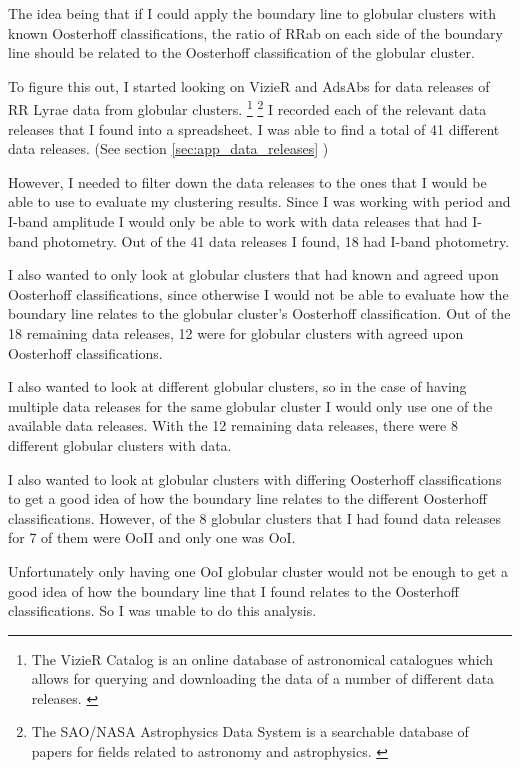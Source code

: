 \documentclass[]{article}
\begin{document}
The idea being that if I could apply the boundary line to globular clusters with known Oosterhoff classifications, the ratio of RRab on each side of the boundary line should be related to the Oosterhoff classification of the globular cluster.

To figure this out, I started looking on VizieR and AdsAbs for data releases of RR Lyrae data from globular clusters. \footnote{The VizieR Catalog is an online database of astronomical catalogues which allows for querying and downloading the data of a number of different data releases. \cite{ochsenbein_2000}} \footnote{The SAO/NASA Astrophysics Data System is a searchable database of papers for fields related to astronomy and astrophysics. \cite{accomazzi_2015}} I recorded each of the relevant data releases that I found into a spreadsheet. I was able to find a total of 41 different data releases. (See section \ref{sec:app_data_releases} )

However, I needed to filter down the data releases to the ones that I would be able to use to evaluate my clustering results. Since I was working with period and I-band amplitude I would only be able to work with data releases that had I-band photometry. Out of the 41 data releases I found, 18 had I-band photometry.

I also wanted to only look at globular clusters that had known and agreed upon Oosterhoff classifications, since otherwise I would not be able to evaluate how the boundary line relates to the globular cluster’s Oosterhoff classification. Out of the 18 remaining data releases, 12 were for globular clusters with agreed upon Oosterhoff classifications.

I also wanted to look at different globular clusters, so in the case of having multiple data releases for the same globular cluster I would only use one of the available data releases. With the 12 remaining data releases, there were 8 different globular clusters with data.

I also wanted to look at globular clusters with differing Oosterhoff classifications to get a good idea of how the boundary line relates to the different Oosterhoff classifications. However, of the 8 globular clusters that I had found data releases for 7 of them were OoII and only one was OoI.

Unfortunately only having one OoI globular cluster would not be enough to get a good idea of how the boundary line that I found relates to the Oosterhoff classifications. So I was unable to do this analysis.
\end{document}
